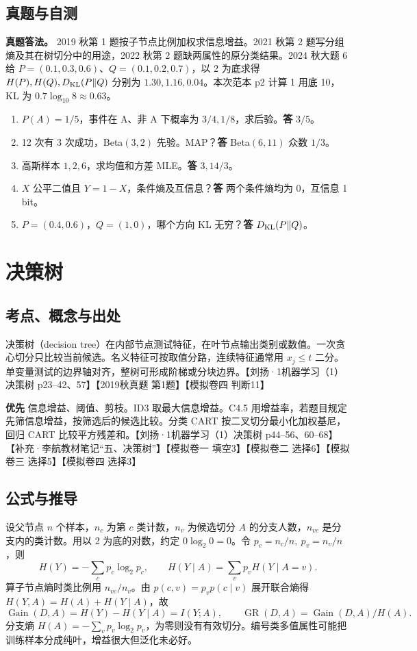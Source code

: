 \documentclass[UTF8,a4paper,zihao=-4,fontset=fandol]{ctexart}
\begin{document}
\subsection{真题与自测}
\textbf{真题答法。} 2019 秋第 1 题按子节点比例加权求信息增益。2021 秋第 2 题写分组熵及其在树切分中的用途，2022 秋第 2 题缺两属性的原分类结果。2024 秋大题 6 给 \(P=(0.1,0.3,0.6)\)、\(Q=(0.1,0.2,0.7)\)，以 2 为底求得 \(H(P),H(Q),D_{\rm KL}(P\Vert Q)\) 分别为 \(1.30,1.16,0.04\)。本次范本 p2 计算 1 用底 10，KL 为 \(0.7\log_{10}8\approx0.63\)。
\begin{enumerate}[nosep,leftmargin=*]
\item \(P(A)=1/5\)，事件在 A、非 A 下概率为 \(3/4,1/8\)，求后验。\textbf{答} \(3/5\)。
\item 12 次有 3 次成功，Beta\((3,2)\) 先验。MAP？\textbf{答} Beta\((6,11)\) 众数 \(1/3\)。
\item 高斯样本 \(1,2,6\)，求均值和方差 MLE。\textbf{答} \(3,14/3\)。
\item \(X\) 公平二值且 \(Y=1-X\)，条件熵及互信息？\textbf{答} 两个条件熵均为 0，互信息 1 bit。
\item \(P=(0.4,0.6)\)，\(Q=(1,0)\)，哪个方向 KL 无穷？\textbf{答} \(D_{\rm KL}(P\Vert Q)\)。
\end{enumerate}

\section{决策树}
\label{ch:prml-tree}

\subsection{考点、概念与出处}
决策树（decision tree）在内部节点测试特征，在叶节点输出类别或数值。一次贪心切分只比较当前候选。名义特征可按取值分路，连续特征通常用 \(x_j\le t\) 二分。单变量测试的边界轴对齐，整树可形成阶梯或分块边界。【刘扬·1机器学习（1）决策树 p23–42、57】【2019秋真题 第1题】【模拟卷四 判断11】

\textbf{优先} 信息增益、阈值、剪枝。ID3 取最大信息增益。C4.5 用增益率，若题目规定先筛信息增益，按筛选后的候选比较。分类 CART 按二叉切分最小化加权基尼，回归 CART 比较平方残差和。【刘扬·1机器学习（1）决策树 p44–56、60–68】【补充·李航教材笔记“五、决策树”】【模拟卷一 填空3】【模拟卷二 选择6】【模拟卷三 选择5】【模拟卷四 选择3】

\subsection{公式与推导}
设父节点 \(n\) 个样本，\(n_c\) 为第 \(c\) 类计数，\(n_v\) 为候选切分 \(A\) 的分支人数，\(n_{vc}\) 是分支内的类计数。用以 2 为底的对数，约定 \(0\log_2 0=0\)。令 \(p_c=n_c/n,\ p_v=n_v/n\)，则
\[
 H(Y)=-\sum_c p_c\log_2 p_c,\qquad
 H(Y\mid A)=\sum_v p_vH(Y\mid A=v).
\]
算子节点熵时类比例用 \(n_{vc}/n_v\)。由 \(p(c,v)=p_vp(c\mid v)\) 展开联合熵得 \(H(Y,A)=H(A)+H(Y\mid A)\)，故
\[
 \operatorname{Gain}(D,A)=H(Y)-H(Y\mid A)=I(Y;A),\qquad
 \operatorname{GR}(D,A)=\operatorname{Gain}(D,A)/H(A).
\]
分支熵 \(H(A)=-\sum_vp_v\log_2p_v\)，为零则没有有效切分。编号类多值属性可能把训练样本分成纯叶，增益很大但泛化未必好。
\end{document}
